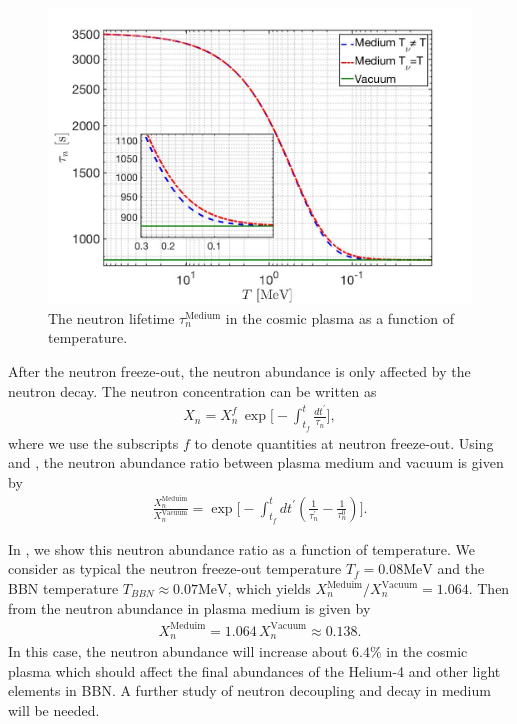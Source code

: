 \begin{figure} 
\centerline{\includegraphics[width=0.9\linewidth]{./plots/Neutron_Lifetime_001}}
\caption{The neutron lifetime $\tau_n^\mathrm{Medium}$ in the cosmic plasma as a function of temperature.}
\label{Decay_Rate} 
\end{figure}

After the neutron freeze-out, the neutron abundance is only affected by the neutron decay. The neutron concentration can be written as 
\begin{align}
\label{Abundance}
X_n=X_n^f\,\exp\bigg[-\int^t_{t_f}\frac{dt^\prime}{\tau_n}\bigg],
\end{align}
where we use the subscripts $f$ to denote quantities at neutron freeze-out. Using  and , the neutron abundance ratio between plasma medium and vacuum is given by
\begin{align}
\label{Abundance_Ratio}
\frac{X_n^{\mathrm{Meduim}}}{X_n^{\mathrm{Vacuum}}}=\exp\bigg[-\int^t_{t_f}dt^\prime\left(\frac{1}{\tau^\prime_n}-\frac{1}{\tau^0_n}\right)\bigg].
\end{align}

In , we show this neutron abundance ratio as a function of temperature. We consider as typical the neutron freeze-out temperature $T_f=0.08\mathrm{MeV}$ and the BBN  temperature $T_{BBN}\approx0.07\mathrm{MeV}$, which yields ${X_n^{\mathrm{Meduim}}}/{X_n^{\mathrm{Vacuum}}}=1.064$. Then from  the neutron abundance in plasma medium is given by
\begin{align}
X_n^{\mathrm{Meduim}}=1.064\,X_n^{\mathrm{Vacuum}}\approx0.138.
\end{align}
In this case, the neutron abundance will increase about $6.4\%$ in the cosmic plasma which should affect the final abundances of the Helium-4 and other light elements in BBN. A further study of neutron decoupling and decay in medium will be needed. 
 
